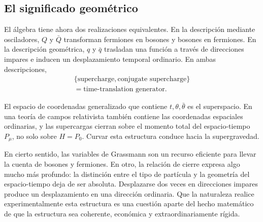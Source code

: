 \begin{classroomqa}
\end{classroomqa}

\begin{classroomqa}
\end{classroomqa}


\subsection{El significado geométrico}

El álgebra tiene ahora dos realizaciones equivalentes. En la descripción mediante osciladores, \(Q\) y \(\bar Q\) transforman fermiones en bosones y bosones en fermiones. En la descripción geométrica, \(q\) y \(\bar q\) trasladan una función a través de direcciones impares e inducen un desplazamiento temporal ordinario. En ambas descripciones,
\begin{equation}
\begin{gathered}
\{\text{supercharge},\text{conjugate supercharge}\}\\
=\text{time-translation generator}.
\end{gathered}
\end{equation}

El espacio de coordenadas generalizado que contiene \(t,\theta,\bar\theta\) es el superspacio. En una teoría de campos relativista también contiene las coordenadas espaciales ordinarias, y las supercargas cierran sobre el momento total del espacio-tiempo \(P_\mu\), no solo sobre \(H=P_0\). Curvar esta estructura conduce hacia la supergravedad.

En cierto sentido, las variables de Grassmann son un recurso eficiente para llevar la cuenta de bosones y fermiones. En otro, la relación de cierre expresa algo mucho más profundo: la distinción entre el tipo de partícula y la geometría del espacio-tiempo deja de ser absoluta. Desplazarse dos veces en direcciones impares produce un desplazamiento en una dirección ordinaria. Que la naturaleza realice experimentalmente esta estructura es una cuestión aparte del hecho matemático de que la estructura sea coherente, económica y extraordinariamente rígida.
